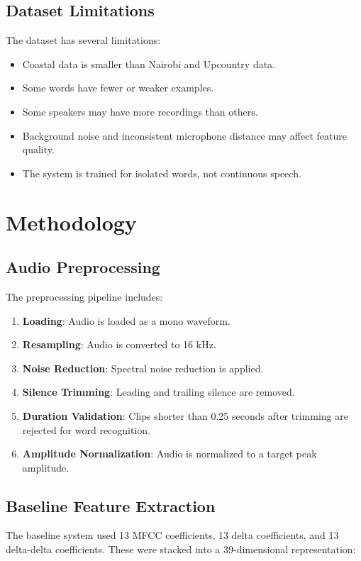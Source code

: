 \documentclass[12pt,a4paper]{report}
\begin{document}
\section{Dataset Limitations}
The dataset has several limitations:

\begin{itemize}
    \item Coastal data is smaller than Nairobi and Upcountry data.
    \item Some words have fewer or weaker examples.
    \item Some speakers may have more recordings than others.
    \item Background noise and inconsistent microphone distance may affect feature quality.
    \item The system is trained for isolated words, not continuous speech.
\end{itemize}

\chapter{Methodology}

\section{Audio Preprocessing}
The preprocessing pipeline includes:

\begin{enumerate}
    \item \textbf{Loading}: Audio is loaded as a mono waveform.
    \item \textbf{Resampling}: Audio is converted to 16 kHz.
    \item \textbf{Noise Reduction}: Spectral noise reduction is applied.
    \item \textbf{Silence Trimming}: Leading and trailing silence are removed.
    \item \textbf{Duration Validation}: Clips shorter than 0.25 seconds after trimming are rejected for word recognition.
    \item \textbf{Amplitude Normalization}: Audio is normalized to a target peak amplitude.
\end{enumerate}

\section{Baseline Feature Extraction}
The baseline system used 13 MFCC coefficients, 13 delta coefficients, and 13 delta-delta coefficients. These were stacked into a 39-dimensional representation:
\end{document}
